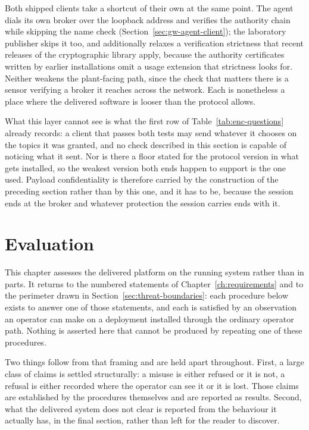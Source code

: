 \documentclass[12pt,a4paper]{report}
\begin{document}
Both shipped clients take a shortcut of their own at the same point. The
agent dials its own broker over the loopback address and verifies the
authority chain while skipping the name check
(Section~\ref{sec:gw-agent-client}); the laboratory publisher skips it too,
and additionally relaxes a verification strictness that recent releases of
the cryptographic library apply, because the authority certificates written
by earlier installations omit a usage extension that strictness looks for.
Neither weakens the plant-facing path, since the check that matters there is
a sensor verifying a broker it reaches across the network. Each is
nonetheless a place where the delivered software is looser than the protocol
allows.

What this layer cannot see is what the first row of
Table~\ref{tab:enc-questions} already records: a client that passes both
tests may send whatever it chooses on the topics it was granted, and no check
described in this section is capable of noticing what it sent. Nor is there a
floor stated for the protocol version in what gets installed, so the weakest
version both ends happen to support is the one used. Payload confidentiality
is therefore carried by the construction of the preceding section rather than
by this one, and it has to be, because the session ends at the broker and
whatever protection the session carries ends with it.

\chapter{Evaluation}
\label{ch:evaluation}

This chapter assesses the delivered platform on the
running system rather than in parts. It returns to the
numbered statements of Chapter~\ref{ch:requirements} and
to the perimeter drawn in Section~\ref{sec:threat-boundaries}:
each procedure below exists to answer one of those
statements, and each is satisfied by an observation an
operator can make on a deployment installed through the
ordinary operator path. Nothing is asserted here that
cannot be produced by repeating one of these procedures.

Two things follow from that framing and are held apart
throughout. First, a large class of claims is settled
structurally: a misuse is either refused or it is not, a
refusal is either recorded where the operator can see it
or it is lost. Those claims are established by the
procedures themselves and are reported as results. Second,
what the delivered system does not clear is reported from
the behaviour it actually has, in the final section, rather
than left for the reader to discover.
\end{document}
